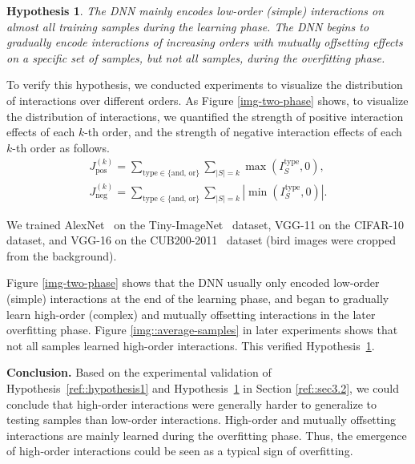 \documentclass[10pt,twocolumn,letterpaper]{article}
\newtheorem{hypothesis}{Hypothesis}
\begin{document}
\begin{hypothesis}\label{ref::hypothesis}
The DNN mainly encodes low-order (simple) interactions on almost all training samples during the learning phase. The DNN begins to gradually encode interactions of increasing orders with mutually offsetting effects on a specific set of samples, but not all samples, during the overfitting phase.
\end{hypothesis}
To verify this hypothesis, we conducted experiments to visualize the distribution of interactions over different orders.
As Figure \ref{img-two-phase} shows, to visualize the distribution of interactions, we quantified the strength of positive interaction effects of each $k$-th order, and the strength of negative interaction effects of each $k$-th order as follows.
{
\small
\begin{equation}\label{ref::strength}
    \begin{split}
        J_{\text{pos}}^{(k)} = \sum_{\text{type} \in \{\text{and, or}\}} \sum_{|S| = k} \max(I^{\text{type}}_S, 0),\\
J_{\text{neg}}^{(k)} = \sum_{\text{type} \in \{\text{and, or}\}} \sum_{|S| = k} |\min(I^{\text{type}}_S, 0)|.
    \end{split}
\end{equation}
}

We trained AlexNet~\citep{krizhevsky2012imagenet} on the Tiny-ImageNet~\cite{tiny-imagenet} dataset, VGG-11 on the CIFAR-10 dataset, and VGG-16 on the CUB200-2011~\citep{wah2011caltech} dataset (bird images were cropped from the background).



Figure \ref{img-two-phase} shows that the DNN
usually only encoded low-order (simple) interactions at the end of the
learning phase, and began to gradually learn high-order (complex) and mutually offsetting interactions in the later overfitting phase. Figure \ref{img::average-samples} in later experiments shows that not all samples learned high-order interactions. This verified Hypothesis~\ref{ref::hypothesis}.


\textbf{Conclusion.} Based on the experimental validation of Hypothesis~\ref{ref::hypothesis1} and Hypothesis~\ref{ref::hypothesis} in Section \ref{ref::sec3.2}, we could conclude that high-order interactions were generally harder to generalize to testing samples than low-order interactions. High-order and mutually offsetting interactions are mainly learned during the overfitting phase. Thus, the emergence of high-order interactions could be seen as a typical sign of overfitting.
\end{document}
